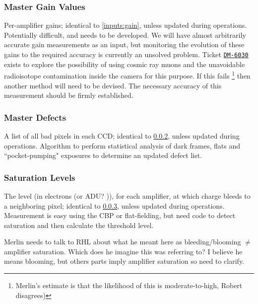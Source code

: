 \subsubsection{Master Gain Values}\label{calibProducts:gains}
Per-amplifier gains; identical to \secsymbol\ref{inputs:gain}, unless updated during operations.
\alg Potentially difficult, and needs to be developed. We will have almost arbitrarily accurate gain measurements as an input, but monitoring the evolution of these gains to the required accuracy is currently an unsolved problem. Ticket \hyperref{https://jira.lsstcorp.org/browse/DM-6030}{}{}{\texttt{DM-6030}} exists to explore the possibility of using cosmic ray muons and the unavoidable radioisotope contamination inside the camera for this purpose. If this fails \footnote{Merlin's estimate is that the likelihood of this is moderate-to-high, Robert disagrees)} then another method will need to be devised. The necessary accuracy of this measurement should be firmly established.


\subsubsection{Master Defects}\label{calibProducts:defectList}
A list of all bad pixels in each CCD; identical to \secsymbol\ref{calibProducts:defectList}, unless updated during operations.
\alg Algorithm to perform statistical analysis of dark frames, flats and ``pocket-pumping" exposures to determine an updated defect list.


\subsubsection{Saturation Levels}\label{calibProducts:saturationLevel}
The level (in electrons (or ADU? \xxx)), for each amplifier, at which charge bleeds to a neighboring pixel; identical to \secsymbol\ref{calibProducts:saturationLevel}, unless updated during operations.
\alg Measurement is easy using the CBP or flat-fielding, but need code to detect saturation and then calculate the threshold level.
\begin{note}
	Merlin needs to talk to RHL about what he meant here as bleeding/blooming $\neq$ amplifier saturation. Which does he imagine this was referring to? I believe he means blooming, but others parts imply amplifier saturation so need to clarify.
\end{note}



